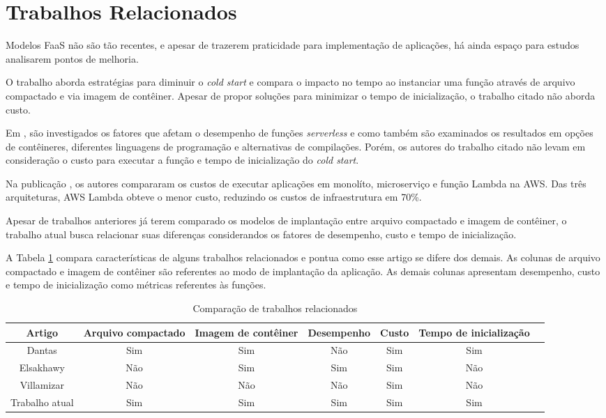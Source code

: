\documentclass[conference]{IEEEtran}
\begin{document}
\section{Trabalhos Relacionados}
\label{sec:TrabRel}

Modelos FaaS não são tão recentes, e apesar de trazerem praticidade para implementação de aplicações, há ainda espaço para estudos analisarem pontos de melhoria.

O trabalho \cite{dantas_2022_reducing_cold_start} aborda estratégias para diminuir o \textit{cold start} e compara o impacto no tempo ao instanciar uma função através de arquivo compactado e via imagem de contêiner. Apesar de propor soluções para minimizar o tempo de inicialização, o trabalho citado não aborda custo.

Em \cite{Elsakhawy_2021_performance_analysis_serverless}, são investigados os fatores que afetam o desempenho de funções \textit{serverless} e como também são examinados os resultados em opções de contêineres, diferentes linguagens de programação e alternativas de compilações. Porém, os autores do trabalho citado não levam em consideração o custo para executar a função e tempo de inicialização do \textit{cold start}.

Na publicação \cite{Villamizar_2017_cost_comparison_lambda}, os autores compararam os custos de executar aplicações em monolíto, microserviço e função Lambda na AWS. Das três arquiteturas, AWS Lambda obteve o menor custo, reduzindo os custos de infraestrutura em 70\%.

Apesar de trabalhos anteriores já terem comparado os modelos de implantação entre arquivo compactado e imagem de contêiner, o trabalho atual busca relacionar suas diferenças considerandos os fatores de desempenho, custo e tempo de inicialização.

A Tabela \ref{tab:related_papers} compara características de alguns trabalhos relacionados e pontua como esse artigo se difere dos demais. As colunas de arquivo compactado e imagem de contêiner são referentes ao modo de implantação da aplicação. As demais colunas apresentam desempenho, custo e tempo de inicialização como métricas referentes às funções.

\begin{table}[htb]
    \centering
    \caption{Comparação de trabalhos relacionados}
    \label{tab:related_papers}
    \begin{tabular}{ccccccc}
        \hline
         Artigo & Arquivo compactado & Imagem de contêiner & Desempenho & Custo & Tempo de inicialização \\
        \hline
         Dantas\cite{dantas_2022_reducing_cold_start} & Sim & Sim & Não & Sim & Sim \\
        \hline
         Elsakhawy\cite{Elsakhawy_2021_performance_analysis_serverless} & Não  & Sim & Sim & Sim & Não \\
        \hline
         Villamizar\cite{Villamizar_2017_cost_comparison_lambda} & Não & Não & Não & Sim & Não \\
        \hline
         Trabalho atual & Sim & Sim & Sim & Sim & Sim \\
        \hline
    \end{tabular}   
\end{table}
\end{document}
